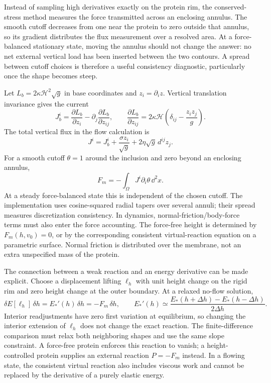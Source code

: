 Instead of sampling high derivatives exactly on the protein rim, the conserved-stress method measures the force transmitted across an enclosing annulus. The smooth cutoff decreases from one near the protein to zero outside that annulus, so its gradient distributes the flux measurement over a resolved area. At a force-balanced stationary state, moving the annulus should not change the answer: no net external vertical load has been inserted between the two contours. A spread between cutoff choices is therefore a useful consistency diagnostic, particularly once the shape becomes steep.


Let $L_b=2\kappa\mathcal H^2\sqrt g$ in base coordinates and $z_i=\partial_i z$. Vertical translation invariance gives the current
\begin{equation}
J_b^i=\frac{\partial L_b}{\partial z_i}-\partial_j\frac{\partial L_b}{\partial z_{ij}},\qquad
\frac{\partial L_b}{\partial z_{ij}}=2\kappa\mathcal H\left(\delta_{ij}-\frac{z_i z_j}{g}\right).
\end{equation}
The total vertical flux in the flow calculation is
\begin{equation}
J^i=J_b^i+\frac{\sigma z_i}{\sqrt g}+2\eta\sqrt g\,d^{ij}z_j .
\end{equation}
For a smooth cutoff $\theta=1$ around the inclusion and zero beyond an enclosing annulus,
\begin{equation}
F_m=-\int_\Omega J^i\partial_i\theta\,\dd^2x.\label{eq:flux}
\end{equation}
At a steady force-balanced state this is independent of the chosen cutoff. The implementation uses cosine-squared radial tapers over several annuli; their spread measures discretization consistency. In dynamics, normal-friction/body-force terms must also enter the force accounting. The force-free height is determined by $F_m(h,v_0)=0$, or by the corresponding consistent virtual-reaction equation on a parametric surface. Normal friction is distributed over the membrane, not an extra unspecified mass of the protein.


The connection between a weak reaction and an energy derivative can be made explicit. Choose a displacement lifting $\ell_h$ with unit height change on the rigid rim and zero height change at the outer boundary. At a relaxed no-flow solution,
\begin{equation}
\delta E[\ell_h]\,\delta h=E_*'(h)\,\delta h=-F_m\,\delta h,
\qquad
E_*'(h)\simeq\frac{E_*(h+\Delta h)-E_*(h-\Delta h)}{2\Delta h}.
\label{eq:reaction-lifting}
\end{equation}
Interior readjustments have zero first variation at equilibrium, so changing the interior extension of $\ell_h$ does not change the exact reaction. The finite-difference comparison must relax both neighboring shapes and use the same slope constraint. A force-free protein enforces this reaction to vanish; a height-controlled protein supplies an external reaction $P=-F_m$ instead. In a flowing state, the consistent virtual reaction also includes viscous work and cannot be replaced by the derivative of a purely elastic energy.

